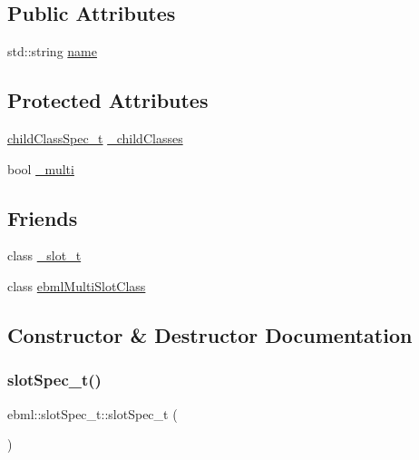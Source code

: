 \subsection*{Public Attributes}
\begin{DoxyCompactItemize}
\item 
std\+::string \mbox{\hyperlink{classebml_1_1slotSpec__t_ab9a69de9a5c4a33b900e3e127a21b4e3}{name}}
\end{DoxyCompactItemize}
\subsection*{Protected Attributes}
\begin{DoxyCompactItemize}
\item 
\mbox{\hyperlink{classebml_1_1childClassSpec__t}{child\+Class\+Spec\+\_\+t}} \mbox{\hyperlink{classebml_1_1slotSpec__t_af1be82ab2c44da470febb4a8a8aa9f2a}{\+\_\+child\+Classes}}
\item 
bool \mbox{\hyperlink{classebml_1_1slotSpec__t_a9cec2fe8084092d36d14ae101bbef2df}{\+\_\+multi}}
\end{DoxyCompactItemize}
\subsection*{Friends}
\begin{DoxyCompactItemize}
\item 
class \mbox{\hyperlink{classebml_1_1slotSpec__t_a03124469c35c80a29b81b969706999df}{\+\_\+slot\+\_\+t}}
\item 
class \mbox{\hyperlink{classebml_1_1slotSpec__t_a229e8a019ffa3d8ab84c711635badcd1}{ebml\+Multi\+Slot\+Class}}
\end{DoxyCompactItemize}


\subsection{Constructor \& Destructor Documentation}
\mbox{\label{classebml_1_1slotSpec__t_a28a3cf34f3ab54176feac825ec132c9e}} 
\subsubsection{\texorpdfstring{slot\+Spec\+\_\+t()}{slotSpec\_t()}\hspace{0.1cm}{\footnotesize\ttfamily [1/4]}}
{\footnotesize\ttfamily ebml\+::slot\+Spec\+\_\+t\+::slot\+Spec\+\_\+t (\begin{DoxyParamCaption}{ }\end{DoxyParamCaption})}

